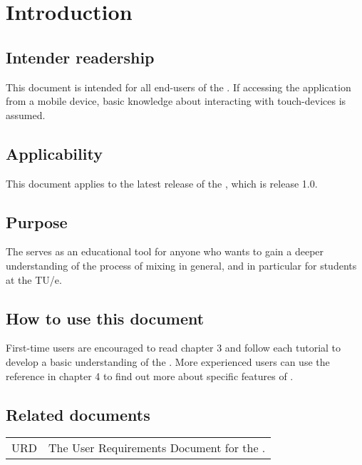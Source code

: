 \chapter{Introduction}

\section{Intender readership}
This document is intended for all end-users of the \applicationname{}. If accessing the application from a mobile device, basic knowledge about interacting with touch-devices is assumed.

\section{Applicability}
This document applies to the latest release of the \applicationname{}, which is release 1.0.

\section{Purpose}
The \applicationname{} serves as an educational tool for anyone who wants to gain a deeper understanding of the process of mixing in general, and in particular for students at the TU/e.

\section{How to use this document}
First-time users are encouraged to read chapter 3 and follow each tutorial to develop a basic understanding of the \applicationname{}.
More experienced users can use the reference in chapter 4 to find out more about specific features of \projectname{}.

\section{Related documents}
\begin{tabular}{l l}
URD & The User Requirements Document for the \applicationname{}.\\
\end{tabular}

